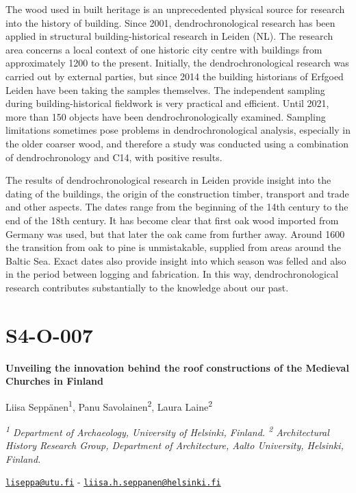 \documentclass[
]{book}
\begin{document}
The wood used in built heritage is an unprecedented physical source for research into the history of building. Since 2001, dendrochronological research has been applied in structural building-historical research in Leiden (NL). The research area concerns a local context of one historic city centre with buildings from approximately 1200 to the present. Initially, the dendrochronological research was carried out by external parties, but since 2014 the building historians of Erfgoed Leiden have been taking the samples themselves. The independent sampling during building-historical fieldwork is very practical and efficient. Until 2021, more than 150 objects have been dendrochronologically examined. Sampling limitations sometimes pose problems in dendrochronological analysis, especially in the older coarser wood, and therefore a study was conducted using a combination of dendrochronology and C14, with positive results.

The results of dendrochronological research in Leiden provide insight into the dating of the buildings, the origin of the construction timber, transport and trade and other aspects. The dates range from the beginning of the 14th century to the end of the 18th century. It has become clear that first oak wood imported from Germany was used, but that later the oak came from further away. Around 1600 the transition from oak to pine is unmistakable, supplied from areas around the Baltic Sea. Exact dates also provide insight into which season was felled and also in the period between logging and fabrication. In this way, dendrochronological research contributes substantially to the knowledge about our past.

\hypertarget{s4-o-007}{%
\section*{S4-O-007}\label{s4-o-007}}

\textbf{Unveiling the innovation behind the roof constructions of the Medieval Churches in Finland}

Liisa Seppänen\textsuperscript{1}, Panu Savolainen\textsuperscript{2}, Laura Laine\textsuperscript{2}

\emph{\textsuperscript{1} Department of Archaeology, University of Helsinki, Finland. \textsuperscript{2} Architectural History Research Group, Department of Architecture, Aalto University, Helsinki, Finland.}

\href{mailto:liseppa@utu.fi}{\nolinkurl{liseppa@utu.fi}} - \href{mailto:liisa.h.seppanen@helsinki.fi}{\nolinkurl{liisa.h.seppanen@helsinki.fi}}
\end{document}
